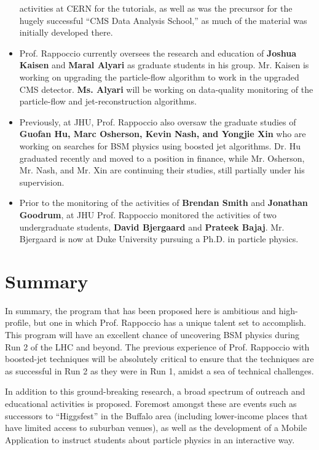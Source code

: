 \documentclass[12pt]{proposalnsf}
\begin{document}
\begin{itemize}
  activities at CERN for the tutorials, as well as was the precursor
  for the hugely successful ``CMS Data Analysis School,'' as much of
  the material was initially developed there. 
\item Prof. Rappoccio currently oversees the research and education of {\bf Joshua
    Kaisen} and {\bf Maral Alyari} as graduate students in his
  group. Mr. Kaisen is working on upgrading the particle-flow
  algorithm to work in the upgraded CMS detector. {\bf Ms. Alyari}
  will be working on data-quality monitoring of the particle-flow and
  jet-reconstruction algorithms.
\item Previously, at JHU, Prof. Rappoccio also oversaw the graduate studies of 
  {\bf Guofan Hu, Marc Osherson, Kevin Nash, and Yongjie Xin} who are
  working on searches for BSM physics using boosted jet
  algorithms. Dr. Hu graduated recently and moved to a position in
  finance, while Mr. Osherson, Mr. Nash, and Mr. Xin are continuing
  their studies, still partially under his supervision. 
\item Prior to the monitoring of the activities of {\bf Brendan Smith} and 
  {\bf Jonathan Goodrum}, at JHU Prof. Rappoccio monitored the activities of two
  undergraduate students, 
  {\bf David Bjergaard} and {\bf Prateek Bajaj}. Mr. Bjergaard is now
  at Duke University pursuing a Ph.D. in particle physics. 
\end{itemize}

\section{Summary}

In summary, the program that has been proposed here is ambitious and
high-profile, but one in which Prof. Rappoccio has a unique talent set to
accomplish. This program will have an excellent chance of uncovering BSM
physics during Run 2 of the LHC and beyond. The previous experience of
Prof. Rappoccio with
boosted-jet techniques will be absolutely critical to ensure that the
techniques are as successful in Run 2 as they were in Run 1, amidst a
sea of technical challenges. 

In addition to this ground-breaking research, a broad
spectrum of outreach and educational activities is proposed. Foremost
amongst
these are events such as successors to ``Higgsfest'' in the Buffalo
area (including lower-income places that have limited access to
suburban venues), as well as the development of a Mobile Application
to instruct students about particle physics in an interactive way. 
\end{document}
